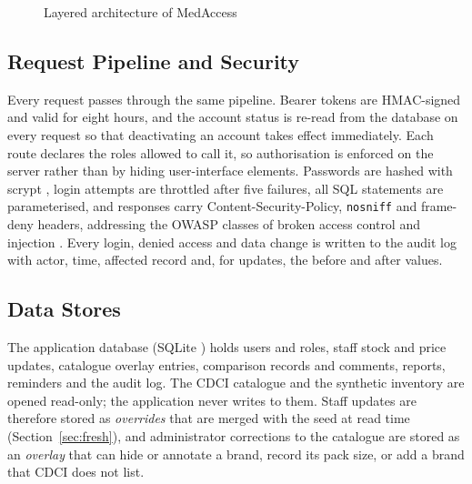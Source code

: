 \documentclass[11pt,a4paper]{article}
\begin{document}
\begin{figure}[H]
{%
}
\caption{Layered architecture of MedAccess}
\label{fig:arch}
\end{figure}

\subsection{Request Pipeline and Security}
Every request passes through the same pipeline. Bearer tokens are HMAC-signed \cite{rfc2104} and valid for eight hours, and the account status is re-read from the database on every request so that deactivating an account takes effect immediately. Each route declares the roles allowed to call it, so authorisation is enforced on the server rather than by hiding user-interface elements. Passwords are hashed with scrypt \cite{percival2009}, login attempts are throttled after five failures, all SQL statements are parameterised, and responses carry Content-Security-Policy, \texttt{nosniff} and frame-deny headers, addressing the OWASP classes of broken access control and injection \cite{owasp2021}. Every login, denied access and data change is written to the audit log with actor, time, affected record and, for updates, the before and after values.

\subsection{Data Stores}
The application database (SQLite \cite{sqlite}) holds users and roles, staff stock and price updates, catalogue overlay entries, comparison records and comments, reports, reminders and the audit log. The CDCI catalogue and the synthetic inventory are opened read-only; the application never writes to them. Staff updates are therefore stored as \emph{overrides} that are merged with the seed at read time (Section~\ref{sec:fresh}), and administrator corrections to the catalogue are stored as an \emph{overlay} that can hide or annotate a brand, record its pack size, or add a brand that CDCI does not list.
\end{document}
